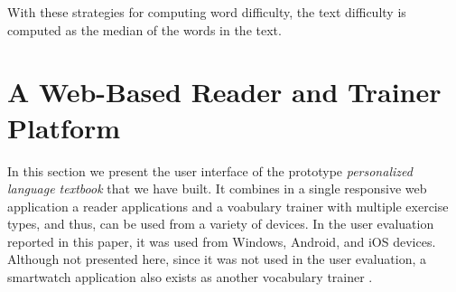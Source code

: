 With these strategies for computing word difficulty, the text difficulty is computed as the median of the words in the text. 


\newpage
\section{A Web-Based Reader and Trainer Platform}


	
	In this section we present the user interface of the prototype {\em personalized language textbook} that we have built. It combines in a single responsive web application a reader applications and a voabulary trainer with multiple exercise types, and thus, can be used from a variety of devices. In the user evaluation reported in this paper, it was used from Windows, Android, and iOS devices. Although not presented here, since it was not used in the user evaluation, a smartwatch application also exists as another vocabulary trainer \cite{Nien16-time}.











